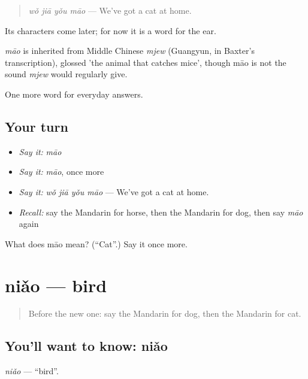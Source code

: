 \begin{quote}
\emph{wǒ jiā yǒu māo} — We've got a cat at home.
\end{quote}

Its characters come later; for now it is a word for the ear.

\begin{cousinweb}
\emph{māo} is inherited from Middle Chinese \emph{mjew} (Guangyun, in Baxter's transcription), glossed 'the animal that catches mice', though māo is not the sound \emph{mjew} would regularly give.
\end{cousinweb}

\begin{grammarlens}[title={What you've built}]
One more word for everyday answers.
\end{grammarlens}

\subsection*{Your turn}
\begin{itemize}
\raggedright
  \item \emph{Say it:} \emph{māo}
  \item \emph{Say it:} \emph{māo}, once more
  \item \emph{Say it:} \emph{wǒ jiā yǒu māo} — We've got a cat at home.
  \item \emph{Recall:} say the Mandarin for horse, then the Mandarin for dog, then say \emph{māo} again
\end{itemize}

\begin{tcolorbox}[breakable,colback=teal!4,colframe=teal!35!black,title={Before you move on}]
What does māo mean? (\textquotedblleft{}Cat\textquotedblright{}.) Say it once more.
\end{tcolorbox}
\section[niǎo]{niǎo — bird}

\label{lesson:ZH-C67-niao}



\begin{quote}
Before the new one: say the Mandarin for dog, then the Mandarin for cat.
\end{quote}

\subsection*{You'll want to know: niǎo}
\emph{niǎo} — \textquotedblleft{}bird\textquotedblright{}.

